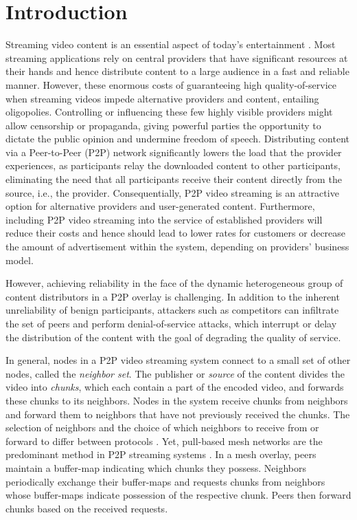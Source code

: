 \section{Introduction}
\label{sec:intro}

Streaming video content is an essential aspect of today's entertainment \cite{emule}.
Most streaming applications rely on central providers that have significant resources at their hands and hence distribute content to a large audience in a fast and reliable manner. 
However, these enormous costs of guaranteeing high quality-of-service when streaming videos impede alternative providers and content, entailing oligopolies. Controlling or influencing these few highly visible providers might allow censorship or propaganda, giving powerful parties the opportunity  to dictate the public opinion and undermine freedom of speech.
Distributing content via a Peer-to-Peer (P2P) network significantly lowers the load that the provider experiences, as participants relay the downloaded content to other participants, eliminating the need that all participants receive their content directly from the source, i.e., the provider. 
Consequentially, P2P video streaming is an attractive option for alternative providers and user-generated content. Furthermore, including 
P2P video streaming into the service of established providers will reduce their costs and hence should lead to lower rates for customers or decrease the amount of advertisement within the system, depending on providers' business model. 


However, achieving reliability in the face of the dynamic heterogeneous group of content distributors in a P2P overlay is challenging. In addition to the inherent unreliability of benign participants, attackers such as competitors can infiltrate the set of peers and perform denial-of-service attacks, which interrupt or delay the distribution of the content with the goal of degrading the quality of service. 

In general, nodes in a P2P video streaming system connect to a small set of other nodes, called the \emph{neighbor set}. 
The publisher or \emph{source} of the content divides the video into \emph{chunks}, which each contain a part of the encoded video, and forwards these chunks to its neighbors. Nodes in the system receive chunks from neighbors and forward them to neighbors that have not previously received the chunks. 
The selection of neighbors and the choice of which neighbors to receive from or forward to differ between protocols \cite{sasi2014survey}.  Yet, pull-based mesh networks are the predominant method in P2P streaming systems \cite{zhang2014modeling}. In a mesh overlay, peers maintain a buffer-map indicating which chunks they possess.  Neighbors periodically exchange their buffer-maps and requests chunks from neighbors whose buffer-maps indicate possession of the respective chunk. Peers then forward chunks based on the received requests. 


